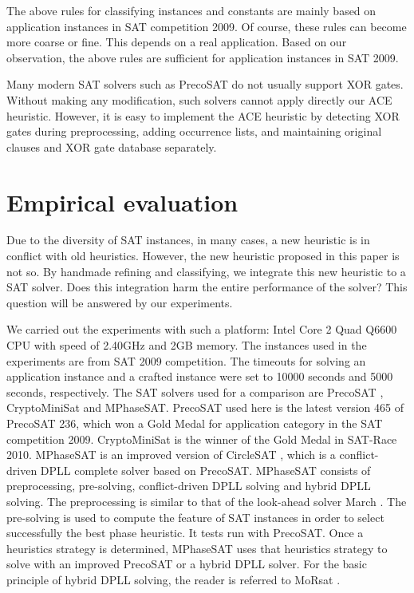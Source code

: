 \documentclass{llncs}
\begin{document}
The above rules for classifying instances and constants are mainly
based on application instances in SAT competition 2009. Of course,
these rules can become more coarse or fine. This depends on a real
application. Based on our observation, the above rules are
sufficient for application instances in SAT 2009.

Many modern SAT solvers such as PrecoSAT do not usually support XOR
gates. Without making any modification, such solvers cannot apply
directly our ACE heuristic. However, it is easy to implement the ACE
heuristic by detecting XOR gates during preprocessing, adding
occurrence lists, and maintaining original clauses and XOR gate
database separately.

\section{Empirical evaluation}
Due to the diversity of SAT instances, in many cases, a new
heuristic is in conflict with old heuristics. However, the new
heuristic proposed in this paper is not so. By handmade refining and
classifying, we integrate this new heuristic to a SAT solver. Does
this integration harm the entire performance of the solver? This
question will be answered by our experiments.

We carried out the experiments with such a platform: Intel Core 2
Quad Q6600 CPU with speed of 2.40GHz and 2GB memory. The instances
used in the experiments are from SAT 2009 competition.  The timeouts
for solving an application instance and a crafted instance were set
to 10000 seconds and 5000 seconds, respectively. The SAT solvers
used for a comparison are PrecoSAT \cite {Precosat10:5},
CryptoMiniSat \cite {CryptoMiniSat:12} and MPhaseSAT. PrecoSAT used
here is the latest version 465 of PrecoSAT 236, which won a Gold
Medal for application category in the SAT competition 2009.
CryptoMiniSat is the winner of the Gold Medal in SAT-Race 2010.
MPhaseSAT is an improved version of CircleSAT \cite {CircleSAT:13},
which is a conflict-driven DPLL complete solver based on PrecoSAT.
MPhaseSAT consists of preprocessing, pre-solving, conflict-driven
DPLL solving and hybrid DPLL solving. The preprocessing is similar
to that of the look-ahead solver March \cite {Marchhi:14}. The
pre-solving is used to compute the feature of SAT instances in order
to select successfully the best phase heuristic. It tests run with
PrecoSAT. Once a heuristics strategy is determined, MPhaseSAT uses
that heuristics strategy to solve with an improved PrecoSAT or a
hybrid DPLL solver. For the basic principle of hybrid DPLL solving,
the reader is referred to MoRsat \cite {MoRsat:15}.
\end{document}

